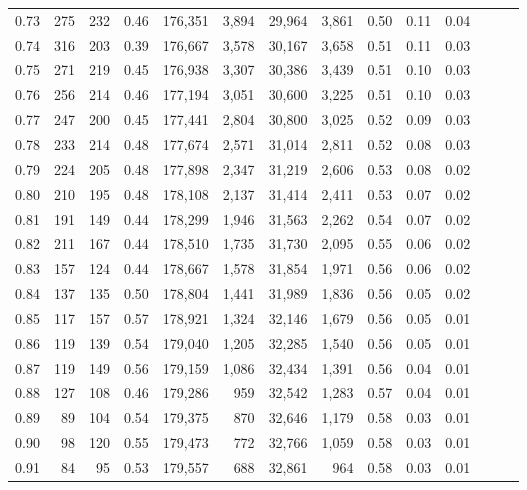 \begin{tabular}{rrrrrrrrrrrrrr}
0.73 &    275 &  232 &  0.46 &  176,351 &    3,894 &  29,964 &   3,861 &  0.50 &  0.11 &      0.04 \\
0.74 &    316 &  203 &  0.39 &  176,667 &    3,578 &  30,167 &   3,658 &  0.51 &  0.11 &      0.03 \\
0.75 &    271 &  219 &  0.45 &  176,938 &    3,307 &  30,386 &   3,439 &  0.51 &  0.10 &      0.03 \\
0.76 &    256 &  214 &  0.46 &  177,194 &    3,051 &  30,600 &   3,225 &  0.51 &  0.10 &      0.03 \\
0.77 &    247 &  200 &  0.45 &  177,441 &    2,804 &  30,800 &   3,025 &  0.52 &  0.09 &      0.03 \\
0.78 &    233 &  214 &  0.48 &  177,674 &    2,571 &  31,014 &   2,811 &  0.52 &  0.08 &      0.03 \\
0.79 &    224 &  205 &  0.48 &  177,898 &    2,347 &  31,219 &   2,606 &  0.53 &  0.08 &      0.02 \\
0.80 &    210 &  195 &  0.48 &  178,108 &    2,137 &  31,414 &   2,411 &  0.53 &  0.07 &      0.02 \\
0.81 &    191 &  149 &  0.44 &  178,299 &    1,946 &  31,563 &   2,262 &  0.54 &  0.07 &      0.02 \\
0.82 &    211 &  167 &  0.44 &  178,510 &    1,735 &  31,730 &   2,095 &  0.55 &  0.06 &      0.02 \\
0.83 &    157 &  124 &  0.44 &  178,667 &    1,578 &  31,854 &   1,971 &  0.56 &  0.06 &      0.02 \\
0.84 &    137 &  135 &  0.50 &  178,804 &    1,441 &  31,989 &   1,836 &  0.56 &  0.05 &      0.02 \\
0.85 &    117 &  157 &  0.57 &  178,921 &    1,324 &  32,146 &   1,679 &  0.56 &  0.05 &      0.01 \\
0.86 &    119 &  139 &  0.54 &  179,040 &    1,205 &  32,285 &   1,540 &  0.56 &  0.05 &      0.01 \\
0.87 &    119 &  149 &  0.56 &  179,159 &    1,086 &  32,434 &   1,391 &  0.56 &  0.04 &      0.01 \\
0.88 &    127 &  108 &  0.46 &  179,286 &      959 &  32,542 &   1,283 &  0.57 &  0.04 &      0.01 \\
0.89 &     89 &  104 &  0.54 &  179,375 &      870 &  32,646 &   1,179 &  0.58 &  0.03 &      0.01 \\
0.90 &     98 &  120 &  0.55 &  179,473 &      772 &  32,766 &   1,059 &  0.58 &  0.03 &      0.01 \\
0.91 &     84 &   95 &  0.53 &  179,557 &      688 &  32,861 &     964 &  0.58 &  0.03 &      0.01 \\

\end{tabular}
